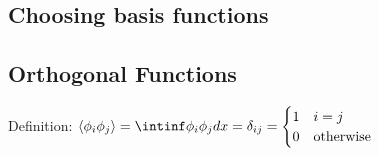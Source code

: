 \documentclass[8pt,a4paper]{scrartcl}
\begin{document}
\begin{multicols*}{3}
%

\section{Choosing basis functions}


\subsection{Orthogonal Functions}

Definition: $\langle\phi_i\phi_j\rangle=\intinf \phi_i\phi_jdx=\delta_{ij}=\begin{cases}1&i=j\\0 &\text{otherwise}\end{cases}$


\end{multicols*}
\end{document}

